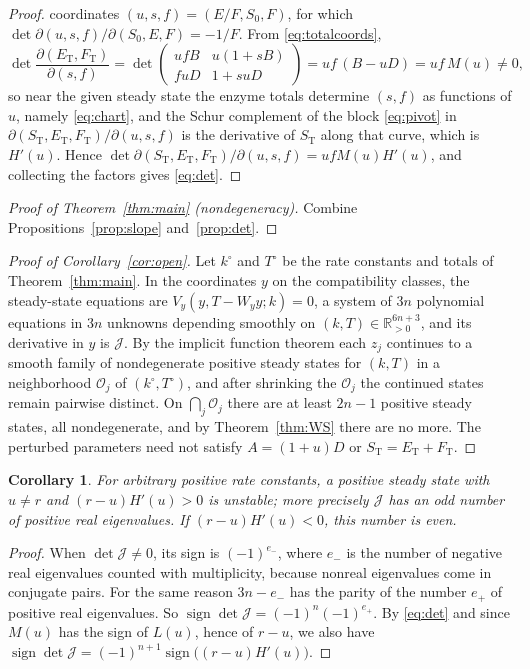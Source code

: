\documentclass[11pt]{article}
\theoremstyle{plain}
\newtheorem{corollary}[theorem]{Corollary}
\theoremstyle{definition}
\theoremstyle{remark}
\numberwithin{equation}{section}
\newcommand{\R}{\mathbb R}
\newcommand{\ET}{E_{\mathrm T}}
\newcommand{\FT}{F_{\mathrm T}}
\newcommand{\ST}{S_{\mathrm T}}
\newcommand{\JS}{\mathcal J}
\DeclareMathOperator{\sign}{sign}
\begin{document}
\begin{proof}
coordinates \((u,s,f)=(E/F,S_0,F)\), for which
\(\det\partial(u,s,f)/\partial(S_0,E,F)=-1/F\). From \eqref{eq:totalcoords},
\begin{equation}\label{eq:pivot}
 \det\frac{\partial(\ET,\FT)}{\partial(s,f)}
 =\det\begin{pmatrix}ufB&u(1+sB)\\ fuD&1+suD\end{pmatrix}=uf\,(B-uD)=uf\,M(u)\ne0,
\end{equation}
so near the given steady state the enzyme totals determine \((s,f)\) as functions of \(u\),
namely \eqref{eq:chart}, and the Schur complement of the block \eqref{eq:pivot} in
\(\partial(\ST,\ET,\FT)/\partial(u,s,f)\) is the derivative of \(\ST\) along that curve, which
is \(H'(u)\). Hence \(\det\partial(\ST,\ET,\FT)/\partial(u,s,f)=ufM(u)H'(u)\), and collecting
the factors gives \eqref{eq:det}.
\end{proof}

\begin{proof}[Proof of Theorem~\ref{thm:main} (nondegeneracy)]
Combine Propositions~\ref{prop:slope} and~\ref{prop:det}.
\end{proof}

\begin{proof}[Proof of Corollary~\ref{cor:open}]
Let \(k^\circ\) and \(T^\circ\) be the rate constants and totals of Theorem~\ref{thm:main}. In
the coordinates \(y\) on the compatibility classes, the steady-state equations are
\(V_y(y,T-W_yy;k)=0\), a system of \(3n\) polynomial equations in \(3n\) unknowns depending
smoothly on \((k,T)\in\R^{6n+3}_{>0}\), and its derivative in \(y\) is \(\JS\). By the
implicit function theorem each \(z_j\) continues to a smooth family of nondegenerate positive
steady states for \((k,T)\) in a neighborhood \(\mathcal O_j\) of \((k^\circ,T^\circ)\), and
after shrinking the \(\mathcal O_j\) the continued states remain pairwise distinct. On
\(\bigcap_j\mathcal O_j\) there are at least \(2n-1\) positive steady states, all
nondegenerate, and by Theorem~\ref{thm:WS} there are no more. The perturbed parameters need
not satisfy \(A=(1+u)D\) or \(\ST=\ET+\FT\).
\end{proof}

\begin{corollary}\label{cor:unstablegeneral}
For arbitrary positive rate constants, a positive steady state with \(u\ne r\) and
\((r-u)H'(u)>0\) is unstable; more precisely \(\JS\) has an odd number of positive real
eigenvalues. If \((r-u)H'(u)<0\), this number is even.
\end{corollary}
\begin{proof}
When \(\det\JS\ne0\), its sign is \((-1)^{e_-}\), where \(e_-\) is the number of negative
real eigenvalues counted with multiplicity, because nonreal eigenvalues come in conjugate
pairs. For the same reason \(3n-e_-\) has the parity of the number \(e_+\) of positive real
eigenvalues. So \(\sign\det\JS=(-1)^{n}(-1)^{e_+}\). By
\eqref{eq:det} and since \(M(u)\) has the sign of \(L(u)\), hence of \(r-u\), we also have
\(\sign\det\JS=(-1)^{n+1}\sign\bigl((r-u)H'(u)\bigr)\).
\end{proof}
\end{document}
